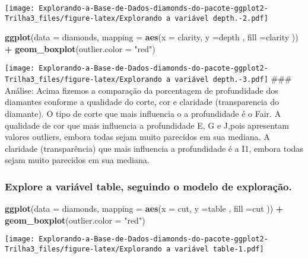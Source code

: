 \documentclass[
]{article}
\newenvironment{Shaded}{\begin{snugshade}}{\end{snugshade}}
\newcommand{\DataTypeTok}[1]{\textcolor[rgb]{0.13,0.29,0.53}{#1}}
\newcommand{\KeywordTok}[1]{\textcolor[rgb]{0.13,0.29,0.53}{\textbf{#1}}}
\newcommand{\NormalTok}[1]{#1}
\newcommand{\OperatorTok}[1]{\textcolor[rgb]{0.81,0.36,0.00}{\textbf{#1}}}
\newcommand{\StringTok}[1]{\textcolor[rgb]{0.31,0.60,0.02}{#1}}
\begin{document}
\texttt{[image: Explorando-a-Base-de-Dados-diamonds-do-pacote-ggplot2-Trilha3\_files/figure-latex/Explorando a variável depth.-2.pdf]}

\begin{Shaded}
\begin{Highlighting}[]
\KeywordTok{ggplot}\NormalTok{(}\DataTypeTok{data =}\NormalTok{ diamonds, }\DataTypeTok{mapping =} \KeywordTok{aes}\NormalTok{(}\DataTypeTok{x =}\NormalTok{ clarity, }\DataTypeTok{y =}\NormalTok{depth , }\DataTypeTok{fill =}\NormalTok{clarity )) }\OperatorTok{+}\StringTok{ }\KeywordTok{geom_boxplot}\NormalTok{(}\DataTypeTok{outlier.color =} \StringTok{"red"}\NormalTok{)}
\end{Highlighting}
\end{Shaded}

\texttt{[image: Explorando-a-Base-de-Dados-diamonds-do-pacote-ggplot2-Trilha3\_files/figure-latex/Explorando a variável depth.-3.pdf]}
\#\#\# Análise: Acima fizemos a comparação da porcentagem de
profundidade dos diamantes conforme a qualidade do corte, cor e
claridade (transparencia do diamante). O tipo de corte que mais
influencia o a profundidade é o Fair. A qualidade de cor que mais
influencia a profundidade E, G e J,pois apresentam valores outliers,
embora todas sejam muito parecidos em sua mediana. A claridade
(transparência) que mais influencia a profundidade é a I1, embora todas
sejam muito parecidos em sua mediana.

\hypertarget{explore-a-variuxe1vel-table-seguindo-o-modelo-de-explorauxe7uxe3o.}{%
\subsubsection{Explore a variável table, seguindo o modelo de
exploração.}\label{explore-a-variuxe1vel-table-seguindo-o-modelo-de-explorauxe7uxe3o.}}

\begin{Shaded}
\begin{Highlighting}[]
\KeywordTok{ggplot}\NormalTok{(}\DataTypeTok{data =}\NormalTok{ diamonds, }\DataTypeTok{mapping =} \KeywordTok{aes}\NormalTok{(}\DataTypeTok{x =}\NormalTok{ cut, }\DataTypeTok{y =}\NormalTok{table , }\DataTypeTok{fill =}\NormalTok{cut )) }\OperatorTok{+}\StringTok{ }\KeywordTok{geom_boxplot}\NormalTok{(}\DataTypeTok{outlier.color =} \StringTok{"red"}\NormalTok{)}
\end{Highlighting}
\end{Shaded}

\texttt{[image: Explorando-a-Base-de-Dados-diamonds-do-pacote-ggplot2-Trilha3\_files/figure-latex/Explorando a variável table-1.pdf]}
\end{document}
